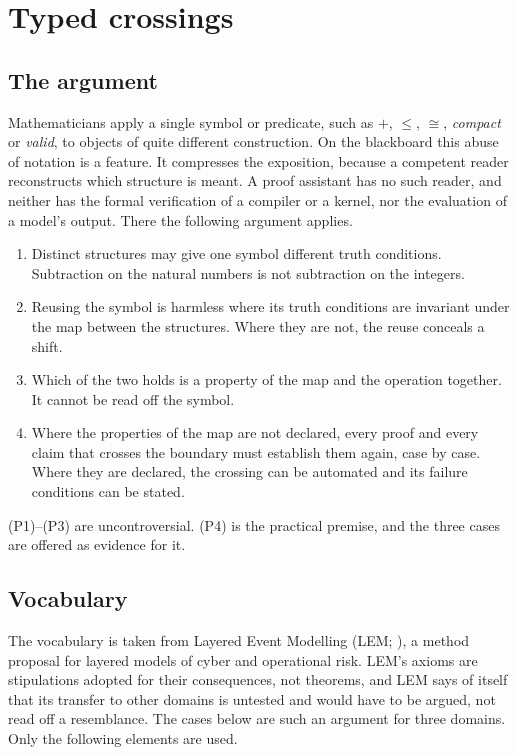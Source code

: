 \section{Typed crossings}
\label{sec:rule}

\subsection{The argument}
\label{sec:argument}

Mathematicians apply a single symbol or predicate, such as $+$, $\le$, $\cong$,
\emph{compact} or \emph{valid}, to objects of quite different construction. On the
blackboard this abuse of notation is a feature. It compresses the exposition, because a
competent reader reconstructs which structure is meant. A proof assistant has no such
reader, and neither has the formal verification of a compiler or a kernel, nor the
evaluation of a model's output. There the following argument applies.

\begin{enumerate}[label=(P\arabic*)]
  \item Distinct structures may give one symbol different truth conditions. Subtraction
        on the natural numbers is not subtraction on the integers.
  \item Reusing the symbol is harmless where its truth conditions are invariant under the
        map between the structures. Where they are not, the reuse conceals a shift.
  \item Which of the two holds is a property of the map and the operation together. It
        cannot be read off the symbol.
  \item Where the properties of the map are not declared, every proof and every claim
        that crosses the boundary must establish them again, case by case. Where they are
        declared, the crossing can be automated and its failure conditions can be stated.
\end{enumerate}

\noindent
(P1)--(P3) are uncontroversial. (P4) is the practical premise, and the three cases are
offered as evidence for it.

\subsection{Vocabulary}
\label{sec:vocabulary}

The vocabulary is taken from Layered Event Modelling (LEM; \citealp{kreinzlem}), a method
proposal for layered models of cyber and operational risk. LEM's axioms are stipulations
adopted for their consequences, not theorems, and LEM says of itself that its transfer to
other domains is untested and would have to be argued, not read off a resemblance. The
cases below are such an argument for three domains. Only the following elements are
used.

